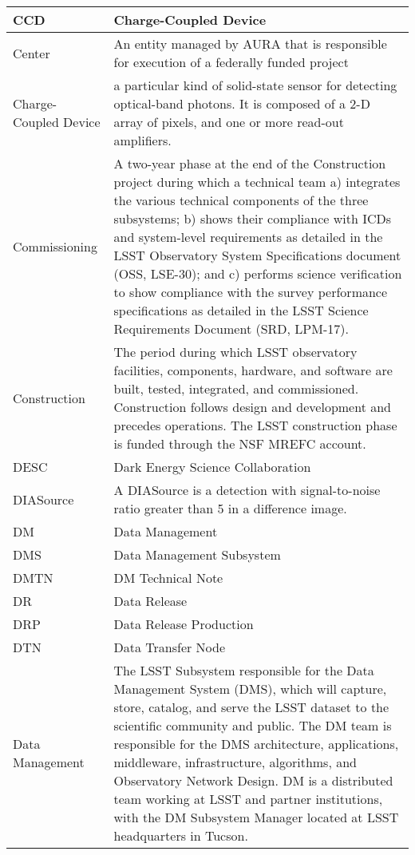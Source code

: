 \begin{longtable}{|l|p{}|}
CCD & \gls{Charge-Coupled Device} \\\hline
Center & An entity managed by \gls{AURA} that is responsible for execution of a federally funded project \\\hline
Charge-Coupled Device & a particular kind of solid-state sensor for detecting optical-band photons. It is composed of a 2-D array of pixels, and one or more read-out amplifiers. \\\hline
Commissioning & A two-year phase at the end of the \gls{Construction} project during which a technical team a) integrates the various technical components of the three subsystems; b) shows their compliance with ICDs and system-level requirements as detailed in the \gls{LSST} Observatory System Specifications document (\gls{OSS}, LSE-30); and c) performs science verification to show compliance with the survey performance specifications as detailed in the \gls{LSST} Science Requirements \gls{Document} (\gls{SRD}, LPM-17). \\\hline
Construction & The period during which \gls{LSST} observatory facilities, components, hardware, and software are built, tested, integrated, and commissioned. \gls{Construction} follows design and development and precedes operations. The \gls{LSST} construction phase is funded through the \gls{NSF} \gls{MREFC} account. \\\hline
DESC & Dark Energy \gls{Science Collaboration} \\\hline
DIASource & A \gls{DIASource} is a detection with signal-to-noise ratio greater than 5 in a difference image. \\\hline
DM & \gls{Data Management} \\\hline
DMS & \gls{Data Management Subsystem} \\\hline
DMTN & \gls{DM} Technical Note \\\hline
DR & \gls{Data Release} \\\hline
DRP & \gls{Data Release Production} \\\hline
DTN & Data Transfer Node \\\hline
Data Management & The \gls{LSST} Subsystem responsible for the \gls{Data Management System} (\gls{DMS}), which will capture, store, catalog, and serve the \gls{LSST} dataset to the scientific community and public. The \gls{DM} team is responsible for the \gls{DMS} architecture, applications, middleware, infrastructure, algorithms, and Observatory Network Design. \gls{DM} is a distributed team working at \gls{LSST} and partner institutions, with the \gls{DM} \gls{Subsystem Manager} located at \gls{LSST} headquarters in Tucson. \\\hline

\end{longtable}
